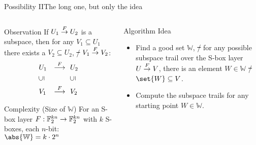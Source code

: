 \begin{frame}{Possibility II}{The long one, but only the idea}
    \begin{columns}[t,onlytextwidth]
        \begin{column}{0.55\textwidth}
            \begin{block}{Observation\vphantom{g}}
                \vspace{0.25em}
                If $U_1 \stackrel{F}{\rightarrow} U_2$ is a subspace, then for any $V_1 \subseteq U_1$ there exists a $V_2 \subseteq U_2$, \st/ $V_1 \stackrel{F}{\rightarrow} V_2$:
                \begin{equation*}
                \begin{aligned}
                    & U_1 & \stackrel{F}{\longrightarrow}\ &\ U_2 \\
                    & \rotatebox[origin=c]{90}{$\subseteq$} & &\ \rotatebox[origin=c]{90}{$\subseteq$} \\
                    & V_1 & \stackrel{F}{\longrightarrow}\ &\ V_2
                \end{aligned}
                \end{equation*}
            \end{block}
            \begin{block}{Complexity (Size of $\mathbb{W}$)}
                For an S-box layer $F : \mathbb{F}_2^{kn} \to \mathbb{F}_2^{kn}$ with $k$ S-boxes, each $n$-bit: $\abs{\mathbb{W}} = k \cdot 2^n$
            \end{block}
        \end{column}
        \begin{column}{0.4\textwidth}
            \begin{block}{Algorithm Idea}
                \begin{minipage}[t][146.5pt][t]{\textwidth}
                \vspace{1em}
                \begin{itemize}
                    \item Find a good set $\mathbb{W}$, \st/ for any possible subspace trail over the S-box layer $U \stackrel{F}{\rightarrow} V$, there is an element $W \in \mathbb{W}$ \st/ $\set{W} \subseteq V$.
                \vspace{1em}
                    \item Compute the subspace trails for any starting point $W \in \mathbb{W}$.
                \end{itemize}
                \vspace{1em}
                \end{minipage}
            \end{block}
        \end{column}
    \end{columns}
\end{frame}

